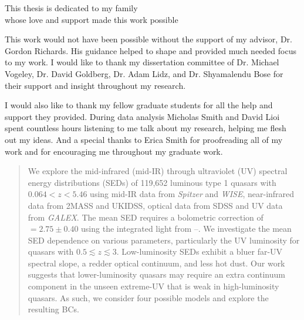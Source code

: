 \begin{preamble}

\iffinal{}{\newpage}

\begin{DUTdedications}
\begin{center}
This thesis is dedicated to my family \\
whose love and support made this work possible\\
\end{center}
\end{DUTdedications}

\iffinal{}{\newpage}

\begin{acknowledgments}
This work would not have been possible without the support of my advisor, Dr. Gordon Richards. His guidance helped to shape and provided much needed focus to my work.  I would like to thank my dissertation committee of Dr. Michael Vogeley, Dr. David Goldberg, Dr. Adam Lidz, and Dr. Shyamalendu Bose for their support and insight throughout my research.

I would also like to thank my fellow graduate students for all the help and support they provided. During data analysis Micholas Smith and David Lioi spent countless hours listening to me talk about my research, helping me flesh out my ideas. And a special thanks to Erica Smith for proofreading all of my work and for encouraging me throughout my graduate work. 
\end{acknowledgments}

\iffinal{}{\newpage}

\tableofcontents 
\iffinal{}{\newpage}

\listoftables
\iffinal{}{\newpage}

\listoffigures 
\iffinal{}{\newpage}

\begin{abstract}

We explore the mid-infrared (mid-IR) through ultraviolet (UV) spectral energy distributions (SEDs) of 119,652 luminous type 1 quasars with $0.064<z<5.46$ using mid-IR data from {\em Spitzer} and {\em WISE}, near-infrared data from 2MASS and UKIDSS, optical data from SDSS and UV data from {\em GALEX}.  The mean SED requires a bolometric correction of \bctwofive$=2.75\pm0.40$ using the integrated light from \onemum--\twokev. 
We investigate the mean SED dependence on various parameters, particularly the UV luminosity for quasars with $0.5\lesssim z\lesssim3$.
Low-luminosity SEDs exhibit a bluer far-UV spectral slope, a redder optical continuum, and less hot dust. 
Our work suggests that lower-luminosity quasars may require an extra continuum component in the unseen extreme-UV that is weak in high-luminosity quasars. As such, we consider four possible models and explore the resulting BCs.


\end{abstract}
\end{preamble}
